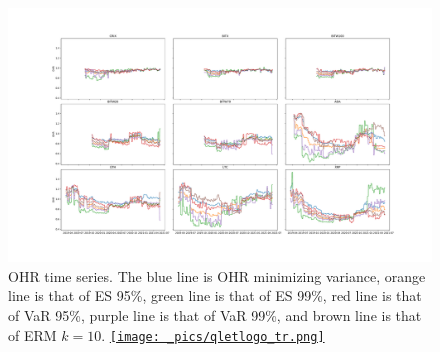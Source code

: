 \newpage
\begin{figure}[ht!]
  \begin{turn}{-90}
    \begin{minipage}{0.9\paperheight}
      \centering
      \includegraphics[angle=0,origin=c, width=0.9\paperheight]{_pics/OHRs_timeseries.pdf}
      \captionsetup{width=0.75\paperheight}
      \caption{ OHR time series. The \textcolor{plt1}{blue line} is OHR minimizing variance,
                                      \textcolor{plt2}{orange line} is that of ES 95\%,
                                      \textcolor{plt3}{green line} is that of ES 99\%,
                                      \textcolor{plt4}{red line} is that of VaR 95\%,
                                      \textcolor{plt5}{purple line} is that of VaR 99\%, and
                                      \textcolor{plt6}{brown line} is that of ERM $k=10$.
      \href{http://www.quantlet.com/}{\texttt{[image: \_pics/qletlogo\_tr.png]}} }
      \label{fig:OHR-timeseries}
    \end{minipage}
  \end{turn}
\end{figure}
\newpage

